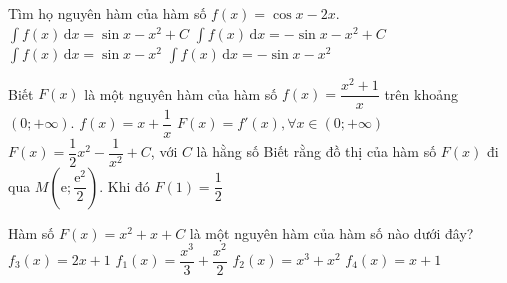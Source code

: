\begin{ex}%
	Tìm họ nguyên hàm của hàm số $f(x) = \cos x - 2x$.
	\choice
	{\True $\displaystyle\int\limits f(x)\mathrm{\,d}x =\sin x-x^2+C$}
	{$\displaystyle\int\limits f(x)\mathrm{\,d}x =-\sin x-x^2+C$}
	{$\displaystyle\int\limits f(x)\mathrm{\,d}x =\sin x-x^2$}
	{$\displaystyle\int\limits f(x)\mathrm{\,d}x =-\sin x-x^2$}
\end{ex}


\begin{ex}%
	Biết $F(x)$ là một nguyên hàm của hàm số $f(x)=\dfrac{x^2+1}{x}$ trên khoảng $(0;+\infty)$.
	\choiceTF
	{\True $f(x)=x+\dfrac{1}{x}$}
	{$F(x)=f'(x), \forall x \in (0;+\infty)$}
	{$F(x)=\dfrac{1}{2}x^2-\dfrac{1}{x^2}+C$, với $C$ là hằng số}
	{Biết rằng đồ thị của hàm số $F(x)$ đi qua $M\left(\mathrm{e};\dfrac{\mathrm{e}^2}{2}\right)$. Khi đó $F(1)=\dfrac{1}{2}$}
\end{ex}

\begin{ex}%
	Hàm số $F(x)=x^2+x+C$ là một nguyên hàm của hàm số nào dưới đây?
	\choice
	{\True $f_3(x)=2x+1$}
	{$f_1(x)=\dfrac{x^3}{3}+\dfrac{x^2}{2}$}
	{$f_2(x)=x^3+x^2$}
	{$f_4(x)=x+1$}
\end{ex}

